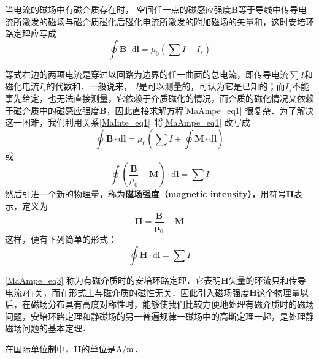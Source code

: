 

当电流的磁场中有磁介质存在时， 空间任一点的磁感应强度$\mathbf B $等于导线中传导电流所激发的磁场与磁介质磁化后磁化电流所激发的附加磁场的矢量和，这时安培环路定理应写成
\begin{equation} \label{MaAmpe_eq1}
\oint \mathbf{B} \cdot \mathrm{d} \mathbf{l}=\mu_{0}\left(\sum I+I_{s}\right)
\end{equation}

等式右边的两项电流是穿过以回路为边界的任一曲面的总电流，即传导电流$\sum I$和磁化电流$I_s$的代数和．一般说来， $I $是可以测量的，可认为它是已知的；而$I_s$不能事先给定，也无法直接测量，它依赖于介质磁化的情况，而介质的磁化情况又依赖于磁介质中的磁感应强度$\mathbf B$，因此直接求解方程\autoref{MaAmpe_eq1} 很复杂．为了解决这一困难，我们利用关系\autoref{MaInte_eq1}~将\autoref{MaAmpe_eq1} 改写成
\begin{equation}
\oint \mathbf{B} \cdot \mathrm{d} \mathbf{l}=\mu_{0}\left(\sum I+\oint \mathbf{M} \cdot \mathrm{d} \mathbf{l}\right)
\end{equation}
或
\begin{equation} 
\oint\left(\frac{\mathbf{B}}{\mu_{0}}-\mathbf{M}\right) \cdot \mathrm{d} \mathbf{l}=\sum I
\end{equation}
然后引进一个新的物理量，称为\textbf{磁场强度（magnetic intensity）}，用符号$\mathbf H$表示，定义为
\begin{equation} \label{MaAmpe_eq2}
\mathbf{H}=\frac{\mathbf{B}}{\mathbf{\mu}_{0}}-\mathbf{M}
\end{equation}
这样，便有下列简单的形式： 
\begin{equation} \label{MaAmpe_eq3}
\oint \mathbf{H} \cdot \mathrm{d} \mathbf{l}=\sum I
\end{equation}

\autoref{MaAmpe_eq3} 称为有磁介质时的安培环路定理．它表明$\mathbf H $矢量的环流只和传导电流$I $有关，而在形式上与磁介质的磁性无关．因此引入磁场强度$\mathbf H $这个物理量以后，在磁场分布具有高度对称性时，能够使我们比较方便地处理有磁介质时的磁场问题，安培环路定理和静磁场的另一普遍规律一磁场中的高斯定理一起，是处理静磁场问题的基本定理．

在国际单位制中，$\mathbf  H $的单位是$\rm A/m$．

